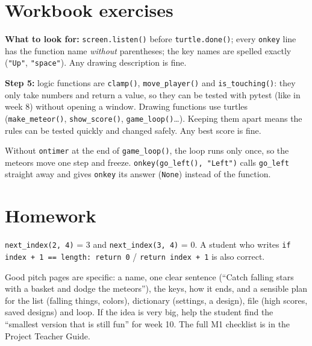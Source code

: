 
\section{Workbook exercises}
\begin{answer}
\textbf{What to look for:} \texttt{screen.listen()} before \texttt{turtle.done()}; every \texttt{onkey} line has the function name \emph{without} parentheses;
the key names are spelled exactly (\texttt{"Up"}, \texttt{"space"}). Any drawing description is fine.
\end{answer}

\begin{answer}
\textbf{Step 5:} logic functions are \texttt{clamp()}, \texttt{move\_player()} and \texttt{is\_touching()}: they only take numbers and return a value, so they
can be tested with pytest (like in week 8) without opening a window. Drawing functions use turtles (\texttt{make\_meteor()}, \texttt{show\_score()},
\texttt{game\_loop()}\ldots). Keeping them apart means the rules can be tested quickly and changed safely. Any best score is fine.
\end{answer}

\begin{answer}[Reflection]
Without \texttt{ontimer} at the end of \texttt{game\_loop()}, the loop runs only once, so the meteors move one step and freeze.
\texttt{onkey(go\_left(), "Left")} calls \texttt{go\_left} straight away and gives \texttt{onkey} its answer (\texttt{None}) instead of the function.
\end{answer}

\section{Homework}
\begin{answer}
\texttt{next\_index(2, 4)} = 3 and \texttt{next\_index(3, 4)} = 0. A student who writes
\texttt{if index + 1 == length: return 0} / \texttt{return index + 1} is also correct.
\end{answer}

\begin{answer}
Good pitch pages are specific: a name, one clear sentence (\enquote{Catch falling stars with a basket and dodge the meteors}), the keys, how it ends,
and a sensible plan for the list (falling things, colors), dictionary (settings, a design), file (high scores, saved designs) and loop.
If the idea is very big, help the student find the \enquote{smallest version that is still fun} for week 10. The full M1 checklist is in the Project Teacher Guide.
\end{answer}

